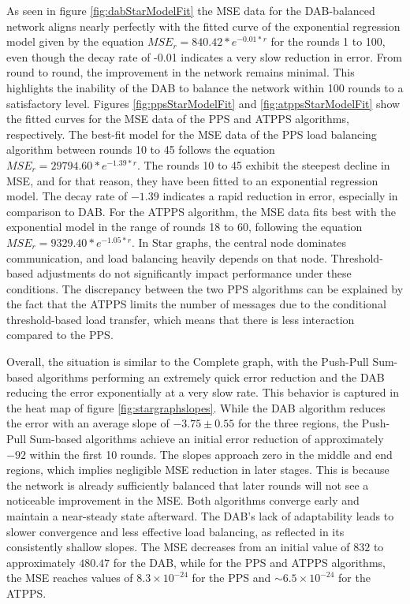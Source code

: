 As seen in figure \ref{fig:dabStarModelFit} the MSE data for the DAB-balanced network aligns nearly perfectly with the fitted curve of the exponential regression model given by the equation $MSE_r=840.42*e^{-0.01*r}$ for the rounds 1 to 100, even though the decay rate of -0.01 indicates a very slow reduction in error. From round to round, the improvement in the network remains minimal. This highlights the inability of the DAB to balance the network within 100 rounds to a satisfactory level. Figures \ref{fig:ppsStarModelFit} and \ref{fig:atppsStarModelFit} show the fitted curves for the MSE data of the PPS and ATPPS algorithms, respectively. The best-fit model for the MSE data of the PPS load balancing algorithm between rounds 10 to 45 follows the equation $MSE_r=29794.60*e^{-1.39*r}$. The rounds 10 to 45 exhibit the steepest decline in MSE, and for that reason, they have been fitted to an exponential regression model. The decay rate of $-1.39$ indicates a rapid reduction in error, especially in comparison to DAB. For the ATPPS algorithm, the MSE data fits best with the exponential model in the range of rounds 18 to 60, following the equation $MSE_r=9329.40*e^{-1.05*r}$. In Star graphs, the central node dominates communication, and load balancing heavily depends on that node. Threshold-based adjustments do not significantly impact performance under these conditions. The discrepancy between the two PPS algorithms can be explained by the fact that the ATPPS limits the number of messages due to the conditional threshold-based load transfer, which means that there is less interaction compared to the PPS.

Overall, the situation is similar to the Complete graph, with the Push-Pull Sum-based algorithms performing an extremely quick error reduction and the DAB reducing the error exponentially at a very slow rate. This behavior is captured in the heat map of figure \ref{fig:stargraphslopes}. While the DAB algorithm reduces the error with an average slope of $-3.75 \pm 0.55$ for the three regions, the Push-Pull Sum-based algorithms achieve an initial error reduction of approximately $-92$ within the first 10 rounds. The slopes approach zero in the middle and end regions, which implies negligible MSE reduction in later stages. This is because the network is already sufficiently balanced that later rounds will not see a noticeable improvement in the MSE. Both algorithms converge early and maintain a near-steady state afterward. The DAB's lack of adaptability leads to slower convergence and less effective load balancing, as reflected in its consistently shallow slopes. The MSE decreases from an initial value of $832$ to approximately $480.47$ for the DAB, while for the PPS and ATPPS algorithms, the MSE reaches values of $8.3\times 10^{-24}$ for the PPS and $\sim6.5 \times 10^{-24}$ for the ATPPS.

